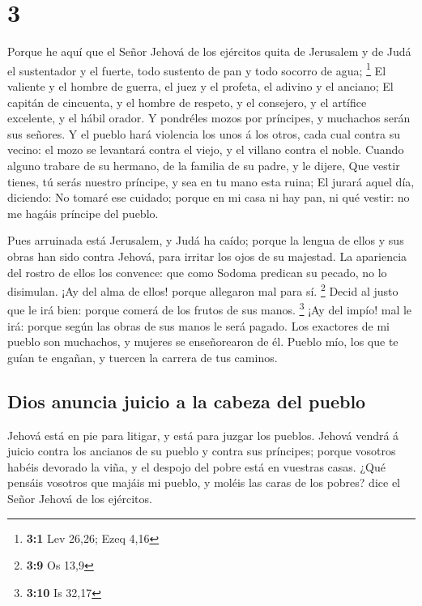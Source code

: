 \hypertarget{section-2}{%
\section{3}\label{section-2}}

 Porque he aquí que el Señor Jehová de los ejércitos quita
de Jerusalem y de Judá el sustentador y el fuerte, todo sustento de pan
y todo socorro de agua; \footnote{\textbf{3:1} Lev 26,26; Ezeq 4,16}
 El valiente y el hombre de guerra, el juez y el profeta,
el adivino y el anciano;  El capitán de cincuenta, y el
hombre de respeto, y el consejero, y el artífice excelente, y el hábil
orador.  Y pondréles mozos por príncipes, y muchachos
serán sus señores.  Y el pueblo hará violencia los unos á
los otros, cada cual contra su vecino: el mozo se levantará contra el
viejo, y el villano contra el noble.  Cuando alguno
trabare de su hermano, de la familia de su padre, y le dijere, Que
vestir tienes, tú serás nuestro príncipe, y sea en tu mano esta ruina;
 El jurará aquel día, diciendo: No tomaré ese cuidado;
porque en mi casa ni hay pan, ni qué vestir: no me hagáis príncipe del
pueblo.

 Pues arruinada está Jerusalem, y Judá ha caído; porque la
lengua de ellos y sus obras han sido contra Jehová, para irritar los
ojos de su majestad.  La apariencia del rostro de ellos
los convence: que como Sodoma predican su pecado, no lo disimulan. ¡Ay
del alma de ellos! porque allegaron mal para sí. \footnote{\textbf{3:9}
  Os 13,9}  Decid al justo que le irá bien: porque comerá
de los frutos de sus manos. \footnote{\textbf{3:10} Is 32,17}
 ¡Ay del impío! mal le irá: porque según las obras de sus
manos le será pagado.  Los exactores de mi pueblo son
muchachos, y mujeres se enseñorearon de él. Pueblo mío, los que te guían
te engañan, y tuercen la carrera de tus caminos.

\hypertarget{dios-anuncia-juicio-a-la-cabeza-del-pueblo}{%
\subsection{Dios anuncia juicio a la cabeza del
pueblo}\label{dios-anuncia-juicio-a-la-cabeza-del-pueblo}}

 Jehová está en pie para litigar, y está para juzgar los
pueblos.  Jehová vendrá á juicio contra los ancianos de
su pueblo y contra sus príncipes; porque vosotros habéis devorado la
viña, y el despojo del pobre está en vuestras casas. 
¿Qué pensáis vosotros que majáis mi pueblo, y moléis las caras de los
pobres? dice el Señor Jehová de los ejércitos.

